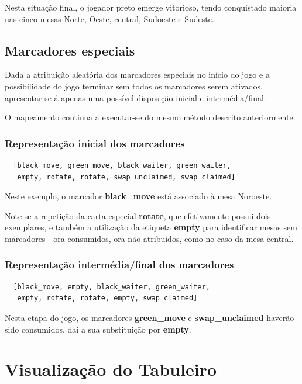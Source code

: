 \documentclass[a4paper]{article}
\begin{document}
Nesta situação final, o jogador preto emerge vitorioso, tendo conquistado maioria nas cinco mesas Norte, Oeste, central, Sudoeste e Sudeste. \newline

\subsection{Marcadores especiais}

Dada a atribuição aleatória dos marcadores especiais no início do jogo e a possibilidade do jogo terminar sem todos os marcadores serem ativados, apresentar-se-á apenas uma possível disposição inicial e intermédia/final.

O mapeamento continua a executar-se do mesmo método descrito anteriormente.

\subsubsection{Representação inicial dos marcadores}
\begin{lstlisting}
  [black_move, green_move, black_waiter, green_waiter, 
   empty, rotate, rotate, swap_unclaimed, swap_claimed]
\end{lstlisting}

Neste exemplo, o marcador \textbf{black\_move} está associado à mesa Noroeste.

Note-se a repetição da carta especial \textbf{rotate}, que efetivamente possui dois exemplares, e também a utilização da etiqueta \textbf{empty} para identificar mesas sem marcadores - ora consumidos, ora não atribuídos, como no caso da mesa central. \newline

\subsubsection{Representação intermédia/final dos marcadores}
\begin{lstlisting}
  [black_move, empty, black_waiter, green_waiter, 
   empty, rotate, rotate, empty, swap_claimed]
\end{lstlisting}

Nesta etapa do jogo, os marcadores \textbf{green\_move} e \textbf{swap\_unclaimed} haverão sido consumidos, daí a sua substituição por \textbf{empty}. \newline


\newpage
\section{Visualização do Tabuleiro}
\end{document}
